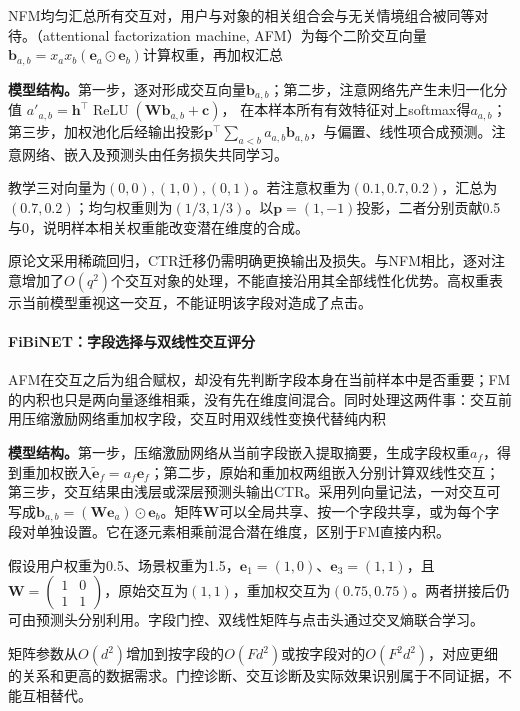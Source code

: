 NFM均匀汇总所有交互对，用户与对象的相关组合会与无关情境组合被同等对待。（attentional factorization machine, AFM）为每个二阶交互向量$\bm b_{a,b}=x_ax_b(\bm e_a\odot\bm e_b)$计算权重，再加权汇总

\textbf{模型结构。}第一步，逐对形成交互向量$\bm b_{a,b}$；第二步，注意网络先产生未归一化分值
$a'_{a,b}=\bm h^\top\operatorname{ReLU}(\bm W\bm b_{a,b}+\bm c)$，
在本样本所有有效特征对上softmax得$a_{a,b}$；第三步，加权池化后经输出投影$\bm p^\top\sum_{a<b}a_{a,b}\bm b_{a,b}$，与偏置、线性项合成预测。注意网络、嵌入及预测头由任务损失共同学习。

教学三对向量为$(0,0),(1,0),(0,1)$。若注意权重为$(0.1,0.7,0.2)$，汇总为$(0.7,0.2)$；均匀权重则为$(1/3,1/3)$。以$\bm p=(1,-1)$投影，二者分别贡献0.5与0，说明样本相关权重能改变潜在维度的合成。

原论文采用稀疏回归，CTR迁移仍需明确更换输出及损失。与NFM相比，逐对注意增加了$O(q^2)$个交互对象的处理，不能直接沿用其全部线性化优势。高权重表示当前模型重视这一交互，不能证明该字段对造成了点击。

\paragraph{FiBiNET：字段选择与双线性交互评分}
\label{sec:rs-fibinet}

AFM在交互之后为组合赋权，却没有先判断字段本身在当前样本中是否重要；FM的内积也只是两向量逐维相乘，没有先在维度间混合。同时处理这两件事：交互前用压缩激励网络重加权字段，交互时用双线性变换代替纯内积

\textbf{模型结构。}第一步，压缩激励网络从当前字段嵌入提取摘要，生成字段权重$a_f$，得到重加权嵌入$\widetilde{\bm e}_f=a_f\bm e_f$；第二步，原始和重加权两组嵌入分别计算双线性交互；第三步，交互结果由浅层或深层预测头输出CTR。采用列向量记法，一对交互可写成$\bm b_{a,b}=(\bm W\bm e_a)\odot\bm e_b$。矩阵$\bm W$可以全局共享、按一个字段共享，或为每个字段对单独设置。它在逐元素相乘前混合潜在维度，区别于FM直接内积。

假设用户权重为0.5、场景权重为1.5，$\bm e_1=(1,0)$、$\bm e_3=(1,1)$，且$\bm W=\left(\begin{smallmatrix}1&0\\1&1\end{smallmatrix}\right)$，原始交互为$(1,1)$，重加权交互为$(0.75,0.75)$。两者拼接后仍可由预测头分别利用。字段门控、双线性矩阵与点击头通过交叉熵联合学习。

矩阵参数从$O(d^2)$增加到按字段的$O(Fd^2)$或按字段对的$O(F^2d^2)$，对应更细的关系和更高的数据需求。门控诊断、交互诊断及实际效果识别属于不同证据，不能互相替代。

